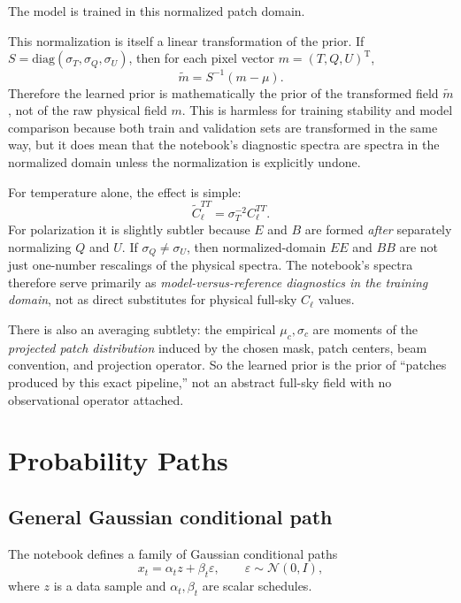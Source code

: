 \documentclass[11pt]{article}
\newcommand{\T}{\mathrm{T}}
\newcommand{\e}{\varepsilon}
\begin{document}
The model is trained in this normalized patch domain.

This normalization is itself a linear transformation of the prior. If \(S=\mathrm{diag}(\sigma_T,\sigma_Q,\sigma_U)\), then for each pixel vector \(m=(T,Q,U)^\T\),
\begin{equation}
  \tilde m = S^{-1}(m-\mu).
\end{equation}
Therefore the learned prior is mathematically the prior of the transformed field \(\tilde m\), not of the raw physical field \(m\). This is harmless for training stability and model comparison because both train and validation sets are transformed in the same way, but it does mean that the notebook's diagnostic spectra are spectra in the normalized domain unless the normalization is explicitly undone.

For temperature alone, the effect is simple:
\begin{equation}
  \widetilde C_\ell^{TT} = \sigma_T^{-2} C_\ell^{TT}.
\end{equation}
For polarization it is slightly subtler because \(E\) and \(B\) are formed \emph{after} separately normalizing \(Q\) and \(U\). If \(\sigma_Q\neq \sigma_U\), then normalized-domain \(EE\) and \(BB\) are not just one-number rescalings of the physical spectra. The notebook's spectra therefore serve primarily as \emph{model-versus-reference diagnostics in the training domain}, not as direct substitutes for physical full-sky \(C_\ell\) values.

There is also an averaging subtlety: the empirical \(\mu_c,\sigma_c\) are moments of the \emph{projected patch distribution} induced by the chosen mask, patch centers, beam convention, and projection operator. So the learned prior is the prior of ``patches produced by this exact pipeline,'' not an abstract full-sky field with no observational operator attached.

\section{Probability Paths}

\subsection{General Gaussian conditional path}

The notebook defines a family of Gaussian conditional paths
\begin{equation}
  x_t = \alpha_t z + \beta_t \e,
  \qquad
  \e \sim \mathcal{N}(0,I),
\end{equation}
where \(z\) is a data sample and \(\alpha_t,\beta_t\) are scalar schedules.
\end{document}
